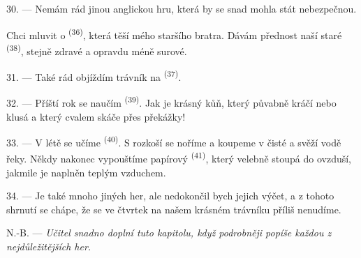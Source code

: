 30. --- Nemám rád jinou anglickou hru, která by se snad mohla stát nebezpečnou.

Chci mluvit o  \textsuperscript{(36)}, která těší mého staršího bratra. Dávám
přednost naší staré  \textsuperscript{(38)}, stejně zdravé a opravdu
méně surové.

\VUsaut{4.6mm}
\VUsaut{3.0mm}

31. --- Také rád objíždím trávník na  \textsuperscript{(37)}.

32. --- Příští rok se naučím  \textsuperscript{(39)}. Jak je krásný
kůň, který půvabně kráčí nebo klusá a který cvalem skáče přes překážky!

33. --- V létě se učíme  \textsuperscript{(40)}. S rozkoší se noříme a koupeme
v čisté a svěží vodě řeky. Někdy nakonec vypouštíme papírový 
\textsuperscript{(41)}, který velebně stoupá do ovzduší, jakmile je naplněn teplým vzduchem.

34. --- Je také mnoho jiných her, ale nedokončil bych jejich výčet, a z tohoto shrnutí se
chápe, že se ve čtvrtek na našem krásném trávníku příliš nenudíme.

N.-B. --- \textit{Učitel snadno doplní tuto kapitolu, když podrobněji popíše každou z
nejdůležitějších her.}

